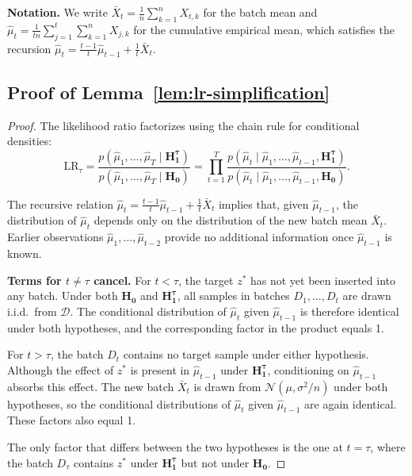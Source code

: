 \documentclass{article}
\theoremstyle{plain}
\theoremstyle{definition}
\theoremstyle{remark}
\begin{document}
\textbf{Notation.} We write $\bar{X}_t = \frac{1}{n}\sum_{k=1}^n X_{t,k}$ for the batch mean and $\hat{\mu}_t = \frac{1}{tn}\sum_{j=1}^t\sum_{k=1}^n X_{j,k}$ for the cumulative empirical mean, which satisfies the recursion $\hat{\mu}_t = \frac{t-1}{t}\hat{\mu}_{t-1} + \frac{1}{t}\bar{X}_t$.

\subsection{Proof of Lemma~\ref{lem:lr-simplification}}
\label{app:proof-lr-simplification}

\lrsimplification*

\begin{proof}
    The likelihood ratio factorizes using the chain rule for conditional densities:
    \begin{equation*}
        \mathrm{LR}_{\tau} = \frac{p(\hat{\mu}_1, \ldots, \hat{\mu}_T \mid \mathbf{H_1^\tau})}{p(\hat{\mu}_1, \ldots, \hat{\mu}_T \mid \mathbf{H_0})} = \prod_{t=1}^{T} \frac{p(\hat{\mu}_t \mid \hat{\mu}_1, \ldots, \hat{\mu}_{t-1}, \mathbf{H_1^\tau})}{p(\hat{\mu}_t \mid \hat{\mu}_1, \ldots, \hat{\mu}_{t-1}, \mathbf{H_0})}.
    \end{equation*}

    The recursive relation $\hat{\mu}_t = \frac{t-1}{t}\hat{\mu}_{t-1} + \frac{1}{t}\bar{X}_t$ implies that, given $\hat{\mu}_{t-1}$, the distribution of $\hat{\mu}_t$ depends only on the distribution of the new batch mean $\bar{X}_t$. Earlier observations $\hat{\mu}_1, \ldots, \hat{\mu}_{t-2}$ provide no additional information once $\hat{\mu}_{t-1}$ is known.

    \textbf{Terms for $t \neq \tau$ cancel.}
    For $t < \tau$, the target $z^*$ has not yet been inserted into any batch. Under both $\mathbf{H_0}$ and $\mathbf{H_1^\tau}$, all samples in batches $D_1, \ldots, D_{t}$ are drawn i.i.d.\ from $\mathcal{D}$. The conditional distribution of $\hat{\mu}_t$ given $\hat{\mu}_{t-1}$ is therefore identical under both hypotheses, and the corresponding factor in the product equals 1.

    For $t > \tau$, the batch $D_t$ contains no target sample under either hypothesis. Although the effect of $z^*$ is present in $\hat{\mu}_{t-1}$ under $\mathbf{H_1^\tau}$, conditioning on $\hat{\mu}_{t-1}$ absorbs this effect. The new batch $\bar{X}_t$ is drawn from $\mathcal{N}(\mu, \sigma^2/n)$ under both hypotheses, so the conditional distributions of $\hat{\mu}_t$ given $\hat{\mu}_{t-1}$ are again identical. These factors also equal 1.

    The only factor that differs between the two hypotheses is the one at $t = \tau$, where the batch $D_\tau$ contains $z^*$ under $\mathbf{H_1^\tau}$ but not under $\mathbf{H_0}$.
\end{proof}
\end{document}
